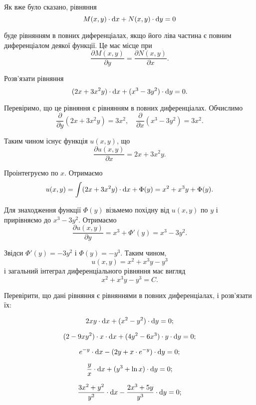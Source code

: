 Як вже було сказано, рівняння \[M(x, y) \cdot \mathop{}\!\mathrm{d} x + N(x, y) \cdot \mathop{}\!\mathrm{d} y = 0\]

 буде рівнянням в повних диференціалах, якщо його ліва частина є повним диференціалом деякої функції. Це має місце при \[\frac{\partial M(x, y)}{\partial y} = \frac{\partial N(x, y)}{\partial x}.\]

\begin{example}
	Розв'язати рівняння \[(2x + 3x^2y) \cdot \mathop{}\!\mathrm{d} x + (x^3 - 3y^2) \cdot \mathop{}\!\mathrm{d} y = 0.\]
\end{example}

\begin{solution}
	Перевіримо, що це рівняння є рівнянням в повних диференціалах. Обчислимо \[ \frac{\partial}{\partial y} (2x + 3x^2y) = 3x^2, \quad \frac{\partial}{\partial x} (x^3 - 3y^2) = 3x^2. \]
	
	Таким чином існує функція $u(x,y)$, що \[\frac{\partial u(x,y)}{\partial x} = 2x + 3x^2y.\] 
	
	Проінтегруємо по $x$. Отримаємо \[ u(x,y) = \int(2x+3x^2y)\cdot\mathop{}\!\mathrm{d} x+\Phi(y)=x^2+x^3y+\Phi(y).\]
	
	Для знаходження функції $\Phi(y)$ візьмемо похідну від $u(x,y)$ по $y$ і прирівняємо до $x^3-3y^2$. Отримаємо \[ \frac{\partial u(x,y)}{\partial y} = x^3 + \Phi'(y) = x^3 - 3y^2.\]

	Звідси $\Phi'(y) = -3y^2$ і $\Phi(y) = -y^3$. Таким чином, \[u(x,y)=x^2+x^3y-y^3\] і загальний інтеграл диференціального рівняння має вигляд \[x^2+x^3y-y^3=C.\]
\end{solution}

Перевірити, що дані рівняння є рівняннями в повних диференціалах, і розв'язати їх:
\begin{problem}
	\[ 2 x y \cdot \mathop{}\!\mathrm{d} x + (x^2 - y^2) \cdot \mathop{}\!\mathrm{d} y = 0;\]
\end{problem}

\begin{problem}
	\[(2-9xy^2)\cdot x\cdot \mathop{}\!\mathrm{d} x + (4y^2-6x^3)\cdot y\cdot \mathop{}\!\mathrm{d} y=0;\]
\end{problem}

\begin{problem}
	\[e^{-y}\cdot\mathop{}\!\mathrm{d} x-(2y+x\cdot e^{-y})\cdot\mathop{}\!\mathrm{d} y=0;\]
\end{problem}

\begin{problem}
	\[ \frac yx\cdot\mathop{}\!\mathrm{d} x+(y^3+\ln x)\cdot\mathop{}\!\mathrm{d} y=0;\]
\end{problem}

\begin{problem}
	\[\frac{3x^2+y^2}{y^2}\cdot\mathop{}\!\mathrm{d} x-\frac{2x^3+5y}{y^3}\cdot\mathop{}\!\mathrm{d} y=0;\]
\end{problem}

